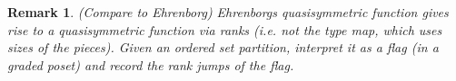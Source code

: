 \documentclass[12pt,reqno]{amsart}
\numberwithin{definition}{section}
\newtheorem{remark}[definition]{Remark}
\theoremstyle{definition}
\begin{document}




\begin{remark}
(Compare to Ehrenborg)
Ehrenborgs quasisymmetric function gives rise to a quasisymmetric function via ranks (i.e. not the type map, which uses sizes of the pieces).  Given an ordered set partition, interpret it as a flag (in a graded poset) and record the rank jumps of the flag.  





\end{remark}








\end{document}
